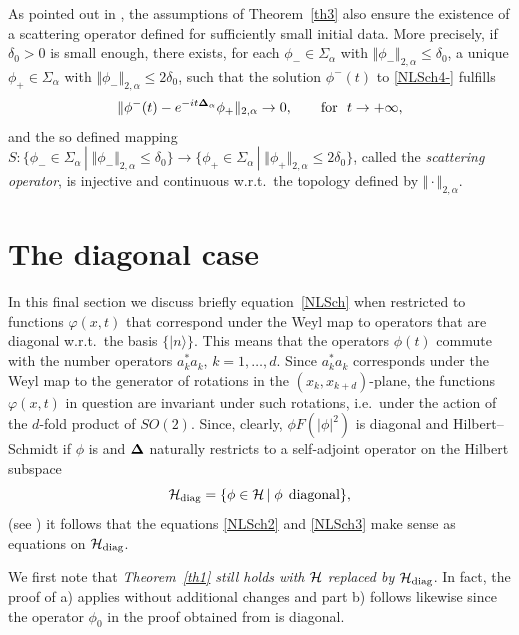 \documentclass[pdftex]{sigma}
\begin{document}
\begin{remark}\label{remscat}
As pointed out in \cite[Theorem 17]{Reed}, the
assumptions of Theorem~\ref{th3} also ensure the existence of a
scattering operator def\/ined for suf\/f\/iciently small initial data. More
precisely, if $\delta_0>0$ is small enough, there exists, for each
$\phi_-\in\Sigma_\alpha$ with $\Vert\phi_-\Vert_{2,\alpha}\leq \delta_0$, a unique
$\phi_+\in\Sigma_\alpha$ with $\Vert\phi_-\Vert_{2,\alpha}\leq 2\delta_0$, such
that the solution $\phi^-(t)$ to \eqref{NLSch4-} fulf\/ills
\[
\Vert\phi^-(t)- e^{-it{{\bf{\Delta}}_\alpha}}\phi_+\Vert_{2,\alpha}  \to
0,\qquad\mbox{for}\ \ t\to +\infty ,
\]
and the so def\/ined mapping
$S: \{\phi_-\in\Sigma_\alpha\,|\;\Vert\phi_-\Vert_{2,\alpha}\leq
\delta_0\}\to\{\phi_+\in\Sigma_\alpha\,|\;\Vert\phi_+\Vert_{2,\alpha}\leq 2\delta_0\}$,
called the {\it scattering operator},
is injective and continuous w.r.t.\ the topology def\/ined by
$\Vert\cdot\Vert_{2,\alpha}$.
\end{remark}



\section{The diagonal case}
\label{secdiag}

In this f\/inal section we discuss brief\/ly equation~\eqref{NLSch} when
restricted to functions $\varphi(x,t)$ that correspond under the Weyl
map to operators that are diagonal w.r.t.\ the basis
$\{|n\rangle\}$. This means that the operators $\phi(t)$ commute with
the number operators $a_k^*a_k$, $k=1,\dots,d$. Since  $a_k^*a_k$ corresponds
under the Weyl map to the generator of rotations in the
$(x_k,x_{k+d})$-plane, the functions $\varphi(x,t)$ in question are
invariant under such rotations, i.e.\ under the action of the
$d$-fold product of $SO(2)$. Since, clearly, $\phi F(|\phi|^2)$ is
diagonal and Hilbert--Schmidt if $\phi$ is and ${\bf\Delta}$ naturally
restricts to a self-adjoint operator on the Hilbert subspace
\[
\mathcal H_{\rm diag} = \{\phi\in{\cal H}\,|\; \phi\;\, \mbox{diagonal}\},
\]
(see \cite{DJN}) it follows that the equations \eqref{NLSch2} and
\eqref{NLSch3} make sense as equations on $\mathcal H_{\rm diag}$.


We f\/irst note that {\it Theorem~\ref{th1} still holds with ${\cal H}$
replaced by $\mathcal H_{\rm diag}$}. In fact, the proof of a) applies without additional
changes and part b) follows likewise since the operator $\phi_0$ in
the proof obtained from \cite{DJN} is diagonal.
\end{document}
